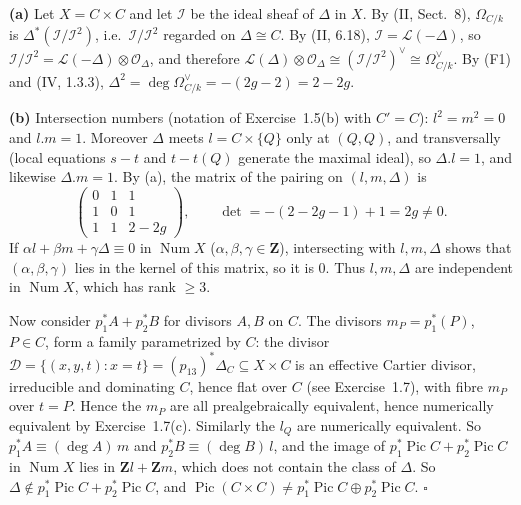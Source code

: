 \documentclass[11pt]{article}
\begin{document}
\pf
\textbf{(a)} Let $X=C\times C$ and let $\mathcal I$ be the ideal sheaf of $\Delta$ in $X$. By (II, Sect.~8), $\Omega_{C/k}$ is $\Delta^*(\mathcal I/\mathcal I^2)$, i.e.\ $\mathcal I/\mathcal I^2$ regarded on $\Delta\cong C$. By (II, 6.18), $\mathcal I=\mathcal L(-\Delta)$, so $\mathcal I/\mathcal I^2=\mathcal L(-\Delta)\otimes\mathcal O_\Delta$, and therefore $\mathcal L(\Delta)\otimes\mathcal O_\Delta\cong(\mathcal I/\mathcal I^2)^\vee\cong\Omega_{C/k}^\vee$. By (F1) and (IV, 1.3.3), $\Delta^2=\deg\Omega_{C/k}^\vee=-(2g-2)=2-2g$.

\textbf{(b)} Intersection numbers (notation of Exercise~1.5(b) with $C'=C$): $l^2=m^2=0$ and $l.m=1$. Moreover $\Delta$ meets $l=C\times\{Q\}$ only at $(Q,Q)$, and transversally (local equations $s-t$ and $t-t(Q)$ generate the maximal ideal), so $\Delta.l=1$, and likewise $\Delta.m=1$. By (a), the matrix of the pairing on $(l,m,\Delta)$ is
\[ \begin{pmatrix}0&1&1\\1&0&1\\1&1&2-2g\end{pmatrix},\qquad \det=-(2-2g-1)+1=2g\neq0 . \]
If $\alpha l+\beta m+\gamma\Delta\equiv0$ in $\operatorname{Num}X$ ($\alpha,\beta,\gamma\in\mathbf Z$), intersecting with $l,m,\Delta$ shows that $(\alpha,\beta,\gamma)$ lies in the kernel of this matrix, so it is $0$. Thus $l,m,\Delta$ are independent in $\operatorname{Num}X$, which has rank $\ge3$.

Now consider $p_1^*A+p_2^*B$ for divisors $A,B$ on $C$. The divisors $m_P=p_1^*(P)$, $P\in C$, form a family parametrized by $C$: the divisor $\mathcal D=\{(x,y,t):x=t\}=(p_{13})^*\Delta_C\subseteq X\times C$ is an effective Cartier divisor, irreducible and dominating $C$, hence flat over $C$ (see Exercise~1.7), with fibre $m_P$ over $t=P$. Hence the $m_P$ are all prealgebraically equivalent, hence numerically equivalent by Exercise~1.7(c). Similarly the $l_Q$ are numerically equivalent. So $p_1^*A\equiv(\deg A)\,m$ and $p_2^*B\equiv(\deg B)\,l$, and the image of $p_1^*\operatorname{Pic}C+p_2^*\operatorname{Pic}C$ in $\operatorname{Num}X$ lies in $\mathbf Zl+\mathbf Zm$, which does not contain the class of $\Delta$. So $\Delta\notin p_1^*\operatorname{Pic}C+p_2^*\operatorname{Pic}C$, and $\operatorname{Pic}(C\times C)\ne p_1^*\operatorname{Pic}C\oplus p_2^*\operatorname{Pic}C$. \hfill$\square$
\end{document}
